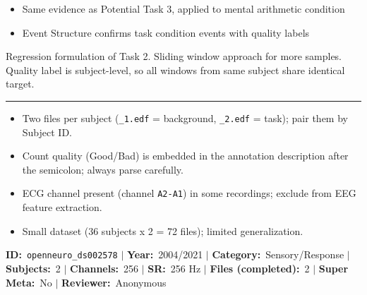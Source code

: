 {\begin{tcolorbox}
\begin{tabular}{@{}p{0.3911\linewidth}p{0.0978\linewidth}p{0.3911\linewidth}@{}}
\bottomrule
\end{tabular}
\endgroup
\par{}\par
\begin{itemize}[leftmargin=1.3em,noitemsep,topsep=1pt]
\item[\scriptsize$\cdot$] {\scriptsize Same evidence as Potential Task 3, applied to mental arithmetic condition}
\item[\scriptsize$\cdot$] {\scriptsize Event Structure confirms task condition events with quality labels}
\end{itemize}
\par{} {\footnotesize Regression formulation of Task 2. Sliding window approach for more samples. Quality label is subject-level, so all windows from same subject share identical target.}
\par\smallskip
\noindent\rule{\linewidth}{0.4pt}\par\nopagebreak
{}\par\smallskip
\begin{itemize}[leftmargin=1.4em,noitemsep,topsep=2pt]
\item{\footnotesize Two files per subject (\texttt{\_1.edf} = background, \texttt{\_2.edf} = task); pair them by Subject ID.}
\item{\footnotesize Count quality (Good/Bad) is embedded in the annotation description after the semicolon; always parse carefully.}
\item{\footnotesize ECG channel present (channel \texttt{A2-A1}) in some recordings; exclude from EEG feature extraction.}
\item{\footnotesize Small dataset (36 subjects x 2 = 72 files); limited generalization.}
\end{itemize}
\end{tcolorbox}
\vspace{3pt}
\noindent\begin{tcolorbox}[breakable,enhanced,colback=white,colframe=gray!55,boxrule=0.9pt,arc=4pt,left=6pt,right=6pt,top=4pt,bottom=4pt,title={\small\bfseries Visual Oddball Task (256 channels)\hfill \colorbox{gray!20}{\scriptsize\sffamily\bfseries Completed}},coltitle=black,colbacktitle=gray!12,titlerule=0.5pt]
{\footnotesize \textbf{ID:}~\texttt{openneuro\_ds002578} $\mid$ \textbf{Year:}~2004/2021 $\mid$ \textbf{Category:}~Sensory/Response $\mid$ \textbf{Subjects:}~2 $\mid$ \textbf{Channels:}~256 $\mid$ \textbf{SR:}~256 Hz $\mid$ \textbf{Files (completed):}~2 $\mid$ \textbf{Super Meta:}~No $\mid$ \textbf{Reviewer:}~Anonymous}

\end{tcolorbox}}
